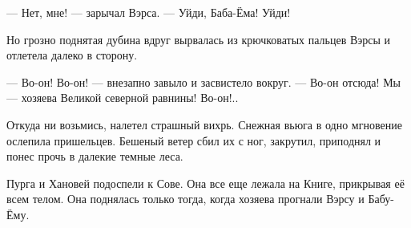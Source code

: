 \documentclass[oneside,final,14pt]{extreport}
\begin{document}
	— Нет, мне! — зарычал Вэрса. — Уйди, Баба-Ёма! Уйди!
	
	Но грозно поднятая дубина вдруг вырвалась из крючковатых пальцев Вэрсы и отлетела далеко в сторону.
	
	— Во-он! Во-он! — внезапно завыло и засвистело вокруг. — Во-он отсюда! Мы — хозяева Великой северной равнины! Во-он!..
	
	Откуда ни возьмись, налетел страшный вихрь. Снежная вьюга в одно мгновение ослепила пришельцев. Бешеный ветер сбил их с ног, закрутил, приподнял и понес прочь в далекие темные леса.
	
	Пурга и Хановей подоспели к Сове. Она все еще лежала на Книге, прикрывая её всем телом. Она поднялась только тогда, когда хозяева прогнали Вэрсу и Бабу-Ёму.
	
	
\end{document}
